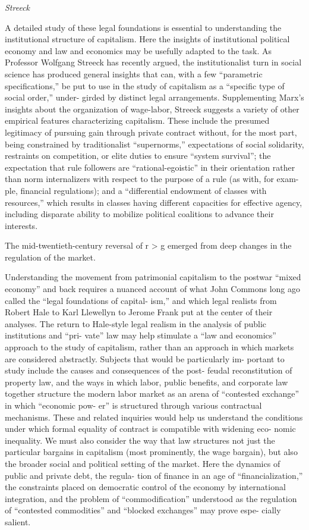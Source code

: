 \documentclass[
]{book}
\begin{document}
\emph{Streeck}

A detailed study of these legal foundations is essential to understanding
the institutional structure of capitalism. Here the insights of
institutional political economy and law and economics may be usefully
adapted to the task. As Professor Wolfgang Streeck has recently argued,
the institutionalist turn in social science has produced general insights
that can, with a few ``parametric specifications,'' be put to use
in the study of capitalism as a ``specific type of social order,'' under-
girded by distinct legal arrangements. Supplementing Marx's insights
about the organization of wage-labor, Streeck suggests a variety
of other empirical features characterizing capitalism. These include
the presumed legitimacy of pursuing gain through private contract
without, for the most part, being constrained by traditionalist
``supernorms,'' expectations of social solidarity, restraints on competition, or
elite duties to ensure ``system survival''; the expectation that rule
followers are ``rational-egoistic'' in their orientation rather than norm
internalizers with respect to the purpose of a rule (as with, for exam-
ple, financial regulations); and a ``differential endowment of classes
with resources,'' which results in classes having different capacities
for effective agency, including disparate ability to mobilize political
coalitions to advance their interests.

The mid-twentieth-century reversal of
r \textgreater{} g emerged from deep changes in the regulation of the market.

Understanding the movement from patrimonial capitalism to the
postwar ``mixed economy'' and back requires a nuanced account of
what John Commons long ago called the ``legal foundations of capital-
ism,'' and which legal realists from Robert Hale to Karl Llewellyn to
Jerome Frank put at the center of their analyses. The return to
Hale-style legal realism in the analysis of public institutions and ``pri-
vate'' law may help stimulate a ``law and economics'' approach to the
study of capitalism, rather than an approach in which markets are
considered abstractly.
Subjects that would be particularly im-
portant to study include the causes and consequences of the post-
feudal reconstitution of property law, and the ways in which labor,
public benefits, and corporate law together structure the modern labor
market as an arena of ``contested exchange'' in which ``economic pow-
er'' is structured through various contractual mechanisms. These
and related inquiries would help us understand the conditions under
which formal equality of contract is compatible with widening eco-
nomic inequality. We must also consider the way that law structures
not just the particular bargains in capitalism (most prominently, the
wage bargain), but also the broader social and political setting of the
market. Here the dynamics of public and private debt, the regula-
tion of finance in an age of ``financialization,'' the constraints placed
on democratic control of the economy by international integration,
and the problem of ``commodification'' understood as the regulation of
``contested commodities'' and ``blocked exchanges'' may prove espe-
cially salient.
\end{document}
